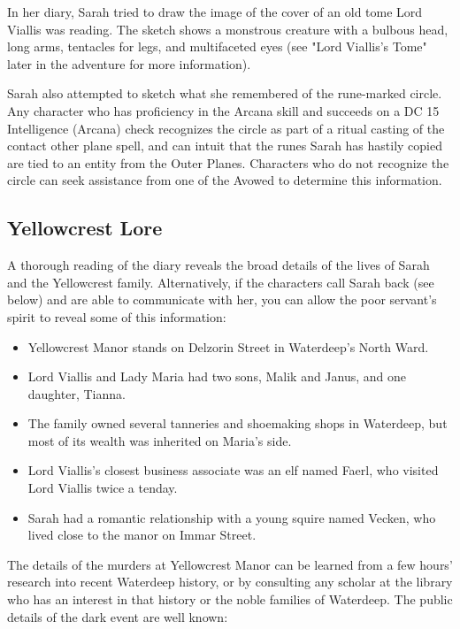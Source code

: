 \documentclass[10pt,a4paper,twoside,bg=print,twocolumn,openany,nodeprecatedcode]{dndbook}
\begin{document}
In her diary, Sarah tried to draw the image of the cover of an old tome Lord Viallis was reading. The sketch shows a monstrous creature with a bulbous head, long arms, tentacles for legs, and multifaceted eyes (see "Lord Viallis's Tome" later in the adventure for more information).

Sarah also attempted to sketch what she remembered of the rune-marked circle. Any character who has proficiency in the Arcana skill and succeeds on a DC 15 Intelligence (Arcana) check recognizes the circle as part of a ritual casting of the contact other plane spell, and can intuit that the runes Sarah has hastily copied are tied to an entity from the Outer Planes. Characters who do not recognize the circle can seek assistance from one of the Avowed to determine this information.

\subsection{Yellowcrest Lore}
A thorough reading of the diary reveals the broad details of the lives of Sarah and the Yellowcrest family. Alternatively, if the characters call Sarah back (see below) and are able to communicate with her, you can allow the poor servant's spirit to reveal some of this information:


\begin{itemize}
\item Yellowcrest Manor stands on Delzorin Street in Waterdeep's North Ward.
\item Lord Viallis and Lady Maria had two sons, Malik and Janus, and one daughter, Tianna.
\item The family owned several tanneries and shoemaking shops in Waterdeep, but most of its wealth was inherited on Maria's side.
\item Lord Viallis's closest business associate was an elf named Faerl, who visited Lord Viallis twice a tenday.
\item Sarah had a romantic relationship with a young squire named Vecken, who lived close to the manor on Immar Street.
\end{itemize}

The details of the murders at Yellowcrest Manor can be learned from a few hours' research into recent Waterdeep history, or by consulting any scholar at the library who has an interest in that history or the noble families of Waterdeep. The public details of the dark event are well known:
\end{document}
